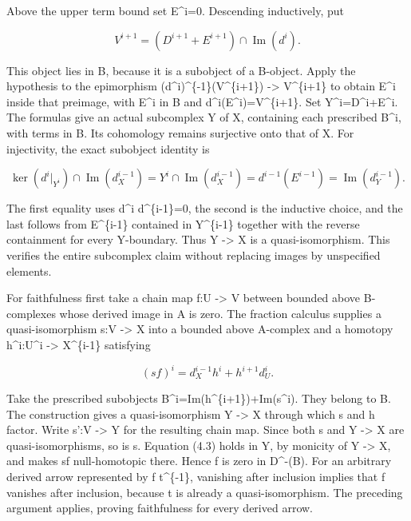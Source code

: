 \documentclass[11pt]{article}
\begin{document}
Above the upper term bound set E\textasciicircum{}i\allowbreak{}=0. Descending inductively,\allowbreak{} put

\[
 V^{i+1}=(D^{i+1}+E^{i+1})\cap\operatorname{Im}(d^i).
\]

This object lies in B,\allowbreak{} because it is a subobject of a B-object. Apply the hypothesis to the epimorphism (d\textasciicircum{}i)\allowbreak{}\textasciicircum{}\{-1\}(V\textasciicircum{}\{i\allowbreak{}+1\})\allowbreak{} \allowbreak{}-> V\textasciicircum{}\{i\allowbreak{}+1\} to obtain E\^{}i inside that preimage,\allowbreak{} with E\^{}i in B and d\textasciicircum{}i(E\textasciicircum{}i)\allowbreak{}\allowbreak{}=V\textasciicircum{}\{i\allowbreak{}+1\}. Set Y\textasciicircum{}i\allowbreak{}=D\textasciicircum{}i\allowbreak{}+E\textasciicircum{}i. The formulas give an actual subcomplex Y of X,\allowbreak{} containing each prescribed B\textasciicircum{}i,\allowbreak{} with terms in B. Its cohomology remains surjective onto that of X. For injectivity,\allowbreak{} the exact subobject identity is

\[
 \ker(d^i|_{Y^i})\cap\operatorname{Im}(d^{i-1}_X)
   =Y^i\cap\operatorname{Im}(d^{i-1}_X)
   =d^{i-1}(E^{i-1})=\operatorname{Im}(d^{i-1}_Y).        \tag{4.2}
\]

The first equality uses d\^{}i d\textasciicircum{}\{i-1\}\allowbreak{}=0,\allowbreak{} the second is the inductive choice,\allowbreak{} and the last follows from E\^{}\{i-1\} contained in Y\^{}\{i-1\} together with the reverse containment for every Y-boundary. Thus Y \allowbreak{}-> X is a quasi-isomorphism. This verifies the entire subcomplex claim without replacing images by unspecified elements.

For faithfulness first take a chain map f:\allowbreak{}U \allowbreak{}-> V between bounded above B-complexes whose derived image in A is zero. The fraction calculus supplies a quasi-isomorphism s:\allowbreak{}V \allowbreak{}-> X into a bounded above A-complex and a homotopy h\textasciicircum{}i:\allowbreak{}U\textasciicircum{}i \allowbreak{}-> X\^{}\{i-1\} satisfying

\[
 (sf)^i=d_X^{i-1}h^i+h^{i+1}d_U^i.                      \tag{4.3}
\]

Take the prescribed subobjects B\textasciicircum{}i\allowbreak{}=Im(h\textasciicircum{}\{i\allowbreak{}+1\})\allowbreak{}\allowbreak{}+Im(s\textasciicircum{}i)\allowbreak{}. They belong to B. The construction gives a quasi-isomorphism Y \allowbreak{}-> X through which s and h factor. Write s':\allowbreak{}V \allowbreak{}-> Y for the resulting chain map. Since both s and Y \allowbreak{}-> X are quasi-isomorphisms,\allowbreak{} so is s\textquotesingle. Equation (4.3)\allowbreak{} holds in Y,\allowbreak{} by monicity of Y \allowbreak{}-> X,\allowbreak{} and makes s\textquotesingle f null-homotopic there. Hence f is zero in D\textasciicircum{}-(B)\allowbreak{}. For an arbitrary derived arrow represented by f t\textasciicircum{}\{-1\},\allowbreak{} vanishing after inclusion implies that f vanishes after inclusion,\allowbreak{} because t is already a quasi-isomorphism. The preceding argument applies,\allowbreak{} proving faithfulness for every derived arrow.
\end{document}
